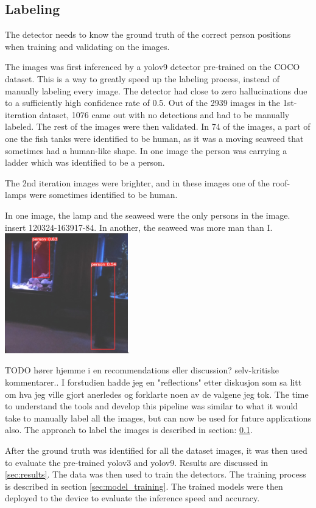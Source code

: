 \subsection{Labeling}
\label{sec:labeling}
The detector needs to know the ground truth of the correct person positions when training and validating on the images. 

The images was first inferenced by a yolov9 detector pre-trained on the COCO dataset. This is a way to greatly speed up the labeling process, instead of manually labeling every image. The detector had close to zero hallucinations due to a sufficiently high confidence rate of 0.5. Out of the 2939 images in the 1st-iteration dataset, 1076 came out with no detections and had to be manually labeled. The rest of the images were then validated. In 74 of the images, a part of one the fish tanks were identified to be human, as it was a moving seaweed that sometimes had a human-like shape. In one image the person was carrying a ladder which was identified to be a person. 

The 2nd iteration images were brighter, and in these images one of the roof-lamps were sometimes identified to be human.

In one image, the lamp and the seaweed were the only persons in the image. insert 120324-163917-84. 
In another, the seaweed was more man than I. \includegraphics[width=0.4\textwidth]{Images/fun/seaweed-man-more-than-I.png}.

TODO hører hjemme i en recommendations eller discussion? selv-kritiske kommentarer.. I forstudien hadde jeg en "reflections" etter diskusjon som sa litt om hva jeg ville gjort anerledes og forklarte noen av de valgene jeg tok. 
The time to understand the tools and develop this pipeline was similar to what it would take to manually label all the images, but can now be used for future applications also. The approach to label the images is described in section: \ref{sec:labeling}.

After the ground truth was identified for all the dataset images, it was then used to evaluate the pre-trained yolov3 and yolov9. Results are discussed in \ref{sec:results}. The data was then used to train the detectors. The training process is described in section \ref{sec:model_training}. The trained models were then deployed to the device to evaluate the inference speed and accuracy.

